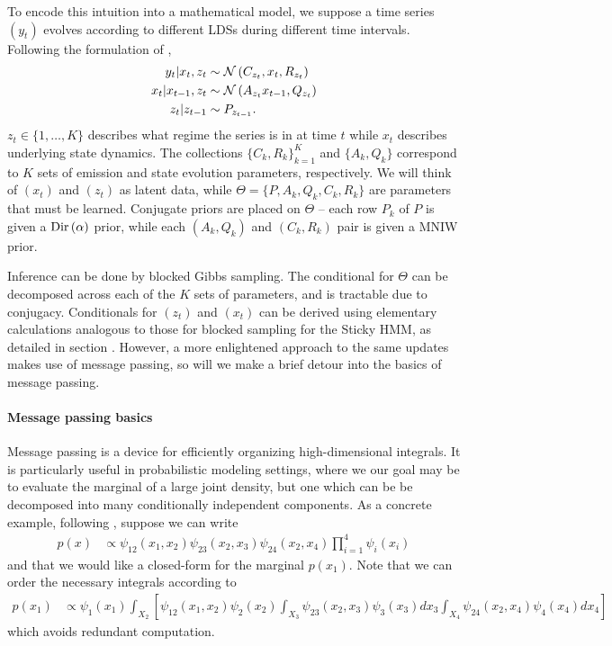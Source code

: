 \documentclass{article}
\begin{document}
To encode this intuition into a mathematical model, we suppose a time series
$\left(y_{t}\right)$ evolves according to different LDSs during different time
intervals. Following the formulation of \citep{linderman2016recurrent},
\begin{align*}
  y_{t} \vert  x_t, z_t &\sim \mathcal{N}\left(C_{z_t}, x_t, R_{z_t}\right) \\
  x_{t} \vert x_{t - 1}, z_{t} &\sim \mathcal{N}\left(A_{z_t}x_{t - 1}, Q_{z_t}\right) \\
  z_t \vert z_{t - 1} &\sim P_{z_{t - 1}}.
\end{align*}
$z_t \in \{1, \dots, K\}$ describes what regime the series is in at time $t$
while $x_t$ describes underlying state dynamics. The collections $\{C_k,
R_k\}_{k = 1}^{K}$ and $\{A_k, Q_k\}$ correspond to $K$ sets of emission and
state evolution parameters, respectively. We will think of $\left(x_t\right)$
and $\left(z_t\right)$ as latent data, while $\Theta = \{P, A_k, Q_k, C_k, R_k\}$
are parameters that must be learned. Conjugate priors are placed on $\Theta$ --
each row $P_k$ of $P$ is given a $\textnormal{Dir}\left(\alpha\right)$ prior, while each
$\left(A_k, Q_k\right)$ and $\left(C_k, R_k\right)$ pair is given a MNIW prior.

Inference can be done by blocked Gibbs sampling. The conditional for $\Theta$
can be decomposed across each of the $K$ sets of parameters, and is tractable
due to conjugacy. Conditionals for $\left(z_t\right)$ and $\left(x_t\right)$ can
be derived using elementary calculations analogous to those for blocked sampling
for the Sticky HMM, as detailed in section \label{sec:sticky_hmms}. However, a
more enlightened approach to the same updates makes use of message passing, so
will we make a brief detour into the basics of message passing.

\paragraph{Message passing basics}
\label{paragraph:message_passing}

Message passing is a device for efficiently organizing high-dimensional
integrals. It is particularly useful in probabilistic modeling settings, where
we our goal may be to evaluate the marginal of a large joint density, but one
which can be be decomposed into many conditionally independent components. As a
concrete example, following \citep{fox2009bayesian}, suppose we can write
\begin{align*}
p\left(x\right) &\propto \psi_{12}\left(x_1, x_2\right)\psi_{23}\left(x_2, x_3\right)\psi_{24}\left(x_2, x_4\right) \prod_{i = 1}^{4}\psi_{i}\left(x_i\right)
\end{align*}
and that we would like a closed-form for the marginal $p\left(x_1\right)$. Note
that we can order the necessary integrals according to
\begin{align*}
  p\left(x_1\right) &\propto \psi_1\left(x_1\right)
  \int_{X_2}\left[\psi_{12}\left(x_1, x_2\right)\psi_2\left(x_2\right)
    \int_{X_3} \psi_{23}\left(x_2, x_3\right) \psi_3\left(x_3\right) dx_3
    \int_{X_4} \psi_{24}\left(x_2, x_4\right)\psi_4\left(x_4\right) dx_4
    \right]
\end{align*}
which avoids redundant computation.
\end{document}
